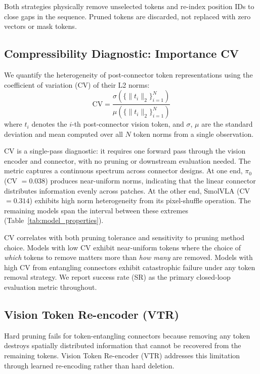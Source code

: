 Both strategies physically remove unselected tokens and re-index position IDs to close gaps in the sequence. Pruned tokens are discarded, not replaced with zero vectors or mask tokens.

\subsection{Compressibility Diagnostic: Importance CV}
\label{sec:cv_diagnostic}

We quantify the heterogeneity of post-connector token representations using the coefficient of variation (CV) of their L2 norms:
\begin{equation}
\text{CV} = \frac{\sigma\!\left(\{\|t_i\|_2\}_{i=1}^{N}\right)}{\mu\!\left(\{\|t_i\|_2\}_{i=1}^{N}\right)}
\label{eq:cv}
\end{equation}
where $t_i$ denotes the $i$-th post-connector vision token, and $\sigma$, $\mu$ are the standard deviation and mean computed over all $N$ token norms from a single observation.

CV is a single-pass diagnostic: it requires one forward pass through the vision encoder and connector, with no pruning or downstream evaluation needed. The metric captures a continuous spectrum across connector designs. At one end, $\pi_0$ (CV $= 0.038$) produces near-uniform norms, indicating that the linear connector distributes information evenly across patches. At the other end, SmolVLA (CV $= 0.314$) exhibits high norm heterogeneity from its pixel-shuffle operation. The remaining models span the interval between these extremes (Table~\ref{tab:model_properties}).

CV correlates with both pruning tolerance and sensitivity to pruning method choice. Models with low CV exhibit near-uniform tokens where the choice of \emph{which} tokens to remove matters more than \emph{how many} are removed. Models with high CV from entangling connectors exhibit catastrophic failure under any token removal strategy. We report success rate (SR) as the primary closed-loop evaluation metric throughout.

\subsection{Vision Token Re-encoder (VTR)}
\label{sec:vtr}

Hard pruning fails for token-entangling connectors because removing any token destroys spatially distributed information that cannot be recovered from the remaining tokens. Vision Token Re-encoder (VTR) addresses this limitation through learned re-encoding rather than hard deletion.


